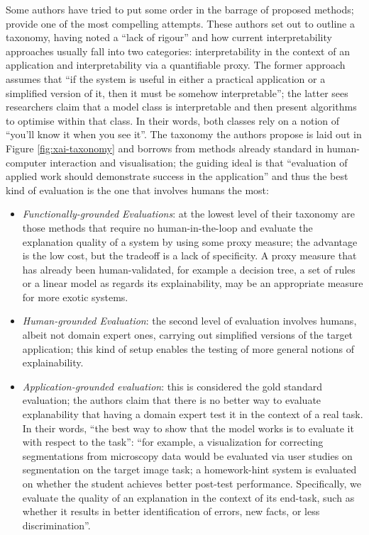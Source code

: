Some authors have tried to put some order in the barrage of proposed methods; \citet{doshi2017towards} provide one of the most compelling attempts.
These authors set out to outline a taxonomy, having noted a \enquote{lack of rigour} and how current interpretability approaches usually fall into two categories: interpretability in the context of an application and interpretability via a quantifiable proxy.
 The former approach assumes that \enquote{if the system is useful in either a practical application or a simplified version of it, then it must be somehow interpretable}; the latter sees researchers claim that a model class is interpretable and then present algorithms to optimise within that class.
 In their words, both classes rely on a notion of \enquote{you'll know it when you see it}.
 The taxonomy the authors propose is laid out in Figure \ref{fig:xai-taxonomy} and borrows from methods already standard in human-computer interaction and visualisation; the guiding ideal is that \enquote{evaluation of applied work should demonstrate success in the application} and thus the best kind of evaluation is the one that involves humans the most:
 \begin{itemize}
  \item \textit{Functionally-grounded Evaluations}: at the lowest level of their taxonomy are those methods that require no human-in-the-loop and evaluate the explanation quality of a system by using some proxy measure; the advantage is the low cost, but the tradeoff is a lack of specificity.
 A proxy measure that has already been human-validated, for example a decision tree, a set of rules or a linear model \citep{guidotti2018survey} as regards its explainability, may be an appropriate measure for more exotic systems.
 \item \textit{Human-grounded Evaluation}: the second level of evaluation involves humans, albeit not domain expert ones, carrying out simplified versions of the target application; this kind of setup enables the testing of more general notions of explainability.
 \item \textit{Application-grounded evaluation}: this is considered the gold standard evaluation; the authors claim that there is no better way to evaluate explanability that having a domain expert test it in the context of a real task.
In their words, \enquote{the best way to show that the model works is to evaluate it with respect to the task}: \enquote{for example, a visualization for correcting segmentations from microscopy data would be evaluated via user studies on segmentation on the target image task; a homework-hint system is evaluated on whether the student achieves better post-test performance.  Specifically, we evaluate the quality of an explanation in the context of its end-task, such as whether it results in better identification of errors, new facts, or less discrimination}.
\end{itemize}
  
